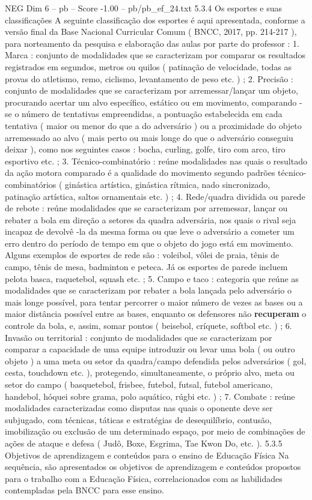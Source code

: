 \begin{textsample}{NEG Dim 6 – pb – Score -1.00 – pb/pb\_ef\_24.txt}  \label{ex:f6_neg_082}
5.3.4 Os esportes e suas classificações A seguinte classificação dos esportes é aqui apresentada, conforme a versão final da Base Nacional Curricular Comum ( BNCC, 2017, pp. 214-217 ), para norteamento da pesquisa e elaboração das aulas por parte do professor : 1.
Marca : conjunto de modalidades que se caracterizam por comparar os resultados registrados em segundos, metros ou quilos ( patinação de velocidade, todas as provas do atletismo, remo, ciclismo, levantamento de peso etc. ) ; 2.
Precisão : conjunto de modalidades que se caracterizam por arremessar/lançar um objeto, procurando acertar um alvo específico, estático ou em movimento, comparando -se o número de tentativas empreendidas, a pontuação estabelecida em cada tentativa ( maior ou menor do que a do adversário ) ou a proximidade do objeto arremessado ao alvo ( mais perto ou mais longe do que o adversário conseguiu deixar ), como nos seguintes casos : bocha, curling, golfe, tiro com arco, tiro esportivo etc. ; 3.
Técnico-combinatório : reúne modalidades nas quais o resultado da ação motora comparado é a qualidade do movimento segundo padrões técnico-combinatórios ( ginástica artística, ginástica rítmica, nado sincronizado, patinação artística, saltos ornamentais etc. ) ; 4.
Rede/quadra dividida ou parede de rebote : reúne modalidades que se caracterizam por arremessar, lançar ou rebater a bola em direção a setores da quadra adversária, nos quais o rival seja incapaz de devolvê -la da mesma forma ou que leve o adversário a cometer um erro dentro do período de tempo em que o objeto do jogo está em movimento.
Alguns exemplos de esportes de rede são : voleibol, vôlei de praia, tênis de campo, tênis de mesa, badminton e peteca.
Já os esportes de parede incluem pelota basca, raquetebol, squash etc. ; 5.
Campo e taco : categoria que reúne as modalidades que se caracterizam por rebater a bola lançada pelo adversário o mais longe possível, para tentar percorrer o maior número de vezes as bases ou a maior distância possível entre as bases, enquanto os defensores não \textbf{recuperam} o controle da bola, e, assim, somar pontos ( beisebol, críquete, softbol etc. ) ; 6.
Invasão ou territorial : conjunto de modalidades que se caracterizam por comparar a capacidade de uma equipe introduzir ou levar uma bola ( ou outro objeto ) a uma meta ou setor da quadra/campo defendida pelos adversários ( gol, cesta, touchdown etc. ), protegendo, simultaneamente, o próprio alvo, meta ou setor do campo ( basquetebol, frisbee, futebol, futsal, futebol americano, handebol, hóquei sobre grama, polo aquático, rúgbi etc. ) ; 7.
Combate : reúne modalidades caracterizadas como disputas nas quais o oponente deve ser subjugado, com técnicas, táticas e estratégias de desequilíbrio, contusão, imobilização ou exclusão de um determinado espaço, por meio de combinações de ações de ataque e defesa ( Judô, Boxe, Esgrima, Tae Kwon Do, etc. ). 5.3.5 Objetivos de aprendizagem e conteúdos para o ensino de Educação Física Na sequência, são apresentados os objetivos de aprendizagem e conteúdos propostos para o trabalho com a Educação Física, correlacionados com as habilidades contempladas pela BNCC para esse ensino.

\end{textsample}
